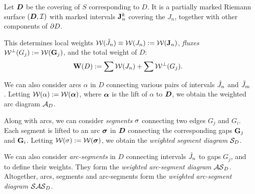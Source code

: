 
Let ${\boldsymbol{D}}$ be 
 the covering of $S$ corresponding to  $D$. It is  a partially marked
 Riemann surface $({\boldsymbol{D}}, {\mathcal I})$  with  marked intervals  ${\mathbf{J}}^k_n$
 covering the $J_n$,
 together with other components of $\partial D$.

 
This determines local weights ${\mathcal W}(\tilde J_n) \equiv {\mathcal W}(J_n) : = {\mathcal W} ({\mathbf{J}}_n)$,
{\it  fluxes} ${\mathcal W}^\perp (G_j):= {\mathcal W}({\mathbf{G}}_j)$, and the total weight of $D$:
$$
   {\mathbf{W}}(D)  : = \sum {\mathcal W} (J_n) + \sum {\mathcal W}^\perp (G_j).  
$$


\msk
We can also consider arcs $\alpha$ in $D$
connecting various pairs of intervals $\tilde J_n$ and $\tilde J_m$.
Letting   ${\mathcal W}(\alpha):= {\mathcal W}({\mbox{\boldmath$\alpha$} })$, 
where ${\mbox{\boldmath$\alpha$} }$ is the  lift of $\alpha$ to ${\boldsymbol{D}}$, we obtain the weighted arc
diagram ${\mathcal A}_D$.

Along with arcs, we can consider {\it segments} ${\sigma}$ connecting two
edges $G_j $ and $G_i$.  Each segment is lifted to an arc ${\boldsymbol{\sigma}}$ in ${\boldsymbol{D}}$
connecting the corresponding  gaps  ${\mathbf{G}}_j$ and  ${\mathbf{G}}_i$. 
Letting ${\mathcal W}({\sigma}) := {\mathcal W}({\boldsymbol{\sigma}})$, we obtain  the  {\it weighted segment diagram}
${\mathcal S}_D$. 

We  can also consider {\it arc-segments} in $D$ connecting intervals
$\tilde J_n$ to  gaps $G_j$, and to define their weights.
They form the  {\it weighted  arc-segment diagram} ${\mathcal{AS}}_D$. 
Altogether,
arcs, segments and arc-segments form the  {\it weighted  arc-segment diagram}
${\mathcal{SAS}}_D$. 


